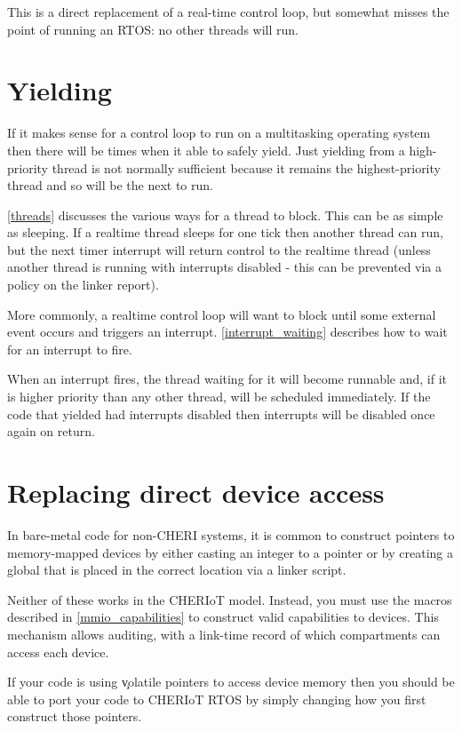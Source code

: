 This is a direct replacement of a real-time control loop, but somewhat misses the point of running an RTOS: no other threads will run.

\section{Yielding}

If it makes sense for a control loop to run on a multitasking operating system then there will be times when it able to safely yield.
Just yielding from a high-priority thread is not normally sufficient because it remains the highest-priority thread and so will be the next to run.

\ref{threads} discusses the various ways for a thread to block.
This can be as simple as sleeping.
If a realtime thread sleeps for one tick then another thread can run, but the next timer interrupt will return control to the realtime thread (unless another thread is running with interrupts disabled - this can be prevented via a policy on the linker report).

More commonly, a realtime control loop will want to block until some external event occurs and triggers an interrupt.
\ref{interrupt_waiting} describes how to wait for an interrupt to fire.

When an interrupt fires, the thread waiting for it will become runnable and, if it is higher priority than any other thread, will be scheduled immediately.
If the code that yielded had interrupts disabled then interrupts will be disabled once again on return.

\section{Replacing direct device access}

In bare-metal code for non-CHERI systems, it is common to construct pointers to memory-mapped devices by either casting an integer to a pointer or by creating a global that is placed in the correct location via a linker script.

Neither of these works in the CHERIoT model.
Instead, you must use the macros described in \ref{mmio_capabilities} to construct valid capabilities to devices.
This mechanism allows auditing, with a link-time record of which compartments can access each device.

If your code is using \c{volatile} pointers to access device memory then you should be able to port your code to CHERIoT RTOS by simply changing how you first construct those pointers.

